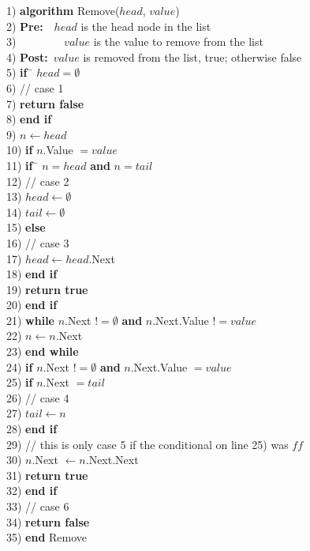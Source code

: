 \begin{tabbing}
1)  \textbf{alg}\= \textbf{orithm} Remove($head$, $value$) \\
2)  \> \textbf{Pre:}~~$head$ is the head node in the list \\
3)  \> ~~~~~~~~$value$ is the value to remove from the list \\
4)  \> \textbf{Post:}~$value$ is removed from the list, true; otherwise false \\
5)  \> \textbf{if}~\= $head = \emptyset$ \\
6)  \> \> // case 1 \\
7)  \> \> \textbf{return false} \\
8)  \> \textbf{end if} \\
9)  \> $n \leftarrow head$ \\
10) \> \textbf{if} $n$.Value $= value$ \\
11) \> \> \textbf{if}~\= $n = head$ \textbf{and} $n = tail$ \\
12) \> \> \> // case 2 \\
13) \> \> \> $head \leftarrow \emptyset$ \\
14) \> \> \> $tail \leftarrow \emptyset$ \\
15) \> \> \textbf{else} \\
16) \> \> \> // case 3 \\
17) \> \> \> $head \leftarrow head$.Next \\
18) \> \> \textbf{end if} \\
19) \> \> \textbf{return true} \\
20) \> \textbf{end if} \\
21) \> \textbf{while} $n$.Next $!= \emptyset$ \textbf{and} $n$.Next.Value $!= value$ \\
22) \> \> $n \leftarrow n$.Next \\
23) \> \textbf{end while} \\
24) \> \textbf{if} $n$.Next $!= \emptyset$ \textbf{and} $n$.Next.Value $= value$ \\
25) \> \> \textbf{if} $n$.Next $= tail$ \\
26) \> \> \> // case 4 \\
27) \> \> \> $tail \leftarrow n$ \\
28) \> \> \textbf{end if} \\
29) \> \> // this is only case 5 if the conditional on line 25) was $ff$ \\
30) \> \> $n$.Next $\leftarrow n$.Next.Next \\
31) \> \> \textbf{return true} \\
32) \> \textbf{end if} \\
33) \> // case 6 \\
34) \> \textbf{return false} \\
35) \textbf{end} Remove \\
\end{tabbing}

